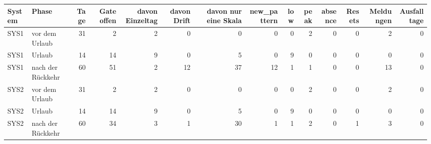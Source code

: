 \begin{tabular}{llrrrrrrrrrrrr}
\toprule
System & Phase & Tage & Gate offen & davon Einzeltag & davon Drift & davon nur eine Skala & new\_pattern & low & peak & absence & Resets & Meldungen & Ausfalltage \\
\midrule
SYS1 & vor dem Urlaub & 31 & 2 & 2 & 0 & 0 & 0 & 0 & 2 & 0 & 0 & 2 & 0 \\
SYS1 & Urlaub & 14 & 14 & 9 & 0 & 5 & 0 & 9 & 0 & 0 & 0 & 0 & 0 \\
SYS1 & nach der Rückkehr & 60 & 51 & 2 & 12 & 37 & 12 & 1 & 1 & 0 & 0 & 13 & 0 \\
SYS2 & vor dem Urlaub & 31 & 2 & 2 & 0 & 0 & 0 & 0 & 2 & 0 & 0 & 2 & 0 \\
SYS2 & Urlaub & 14 & 14 & 9 & 0 & 5 & 0 & 9 & 0 & 0 & 0 & 0 & 0 \\
SYS2 & nach der Rückkehr & 60 & 34 & 3 & 1 & 30 & 1 & 1 & 2 & 0 & 1 & 3 & 0 \\
\bottomrule
\end{tabular}
